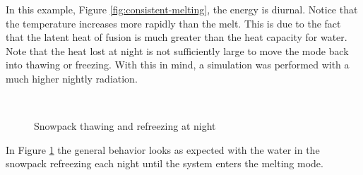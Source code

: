 \documentclass{article}
\begin{document}
In this example, Figure \ref{fig:consistent-melting}, the energy is diurnal.
Notice that the temperature increases more rapidly than the melt.
This is due to the fact that the latent heat of fusion is much
greater than the heat capacity for water.
Note that the heat lost at night is not sufficiently large
to move the mode back into thawing or freezing.
With this in mind, a simulation was performed with a much
higher nightly radiation.


\begin{figure}
\centering
\mbox{
 \quad
{}
}
\caption{Snowpack thawing and refreezing at night} \label{fig:refreezing-melt}
\end{figure}

In Figure \ref{fig:refreezing-melt} the general behavior looks as expected
with the water in the snowpack refreezing each night until
the system enters the melting mode.
\end{document}

